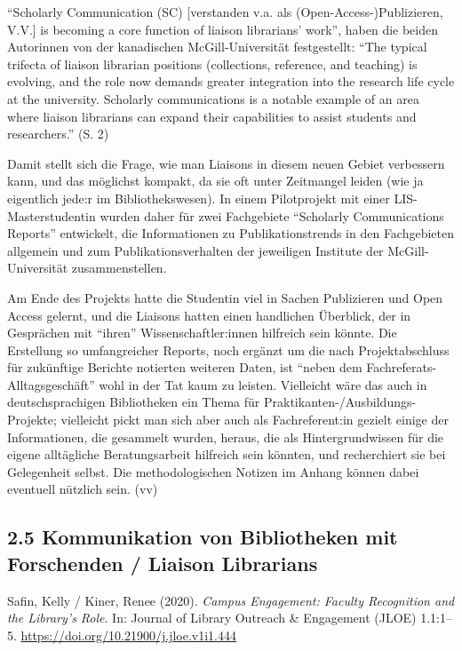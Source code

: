 \documentclass[a4paper,
fontsize=11pt,
oneside,
numbers=noperiodatend,
parskip=half-,
bibliography=totoc,
final
]{scrartcl}
\begin{document}
\enquote{Scholarly Communication (SC) {[}verstanden v.a. als
(Open-Access-)Publizieren, V.V.{]} is becoming a core function of
liaison librarians' work}, haben die beiden Autorinnen von der
kanadischen McGill-Universität festgestellt: \enquote{The typical
trifecta of liaison librarian positions (collections, reference, and
teaching) is evolving, and the role now demands greater integration into
the research life cycle at the university. Scholarly communications is a
notable example of an area where liaison librarians can expand their
capabilities to assist students and researchers.} (S. 2)

Damit stellt sich die Frage, wie man Liaisons in diesem neuen Gebiet
verbessern kann, und das möglichst kompakt, da sie oft unter Zeitmangel
leiden (wie ja eigentlich jede:r im Bibliothekswesen). In einem
Pilotprojekt mit einer LIS-Masterstudentin wurden daher für zwei
Fachgebiete \enquote{Scholarly Communications Reports} entwickelt, die
Informationen zu Publikationstrends in den Fachgebieten allgemein und
zum Publikationsverhalten der jeweiligen Institute der
McGill-Universität zusammenstellen.

Am Ende des Projekts hatte die Studentin viel in Sachen Publizieren und
Open Access gelernt, und die Liaisons hatten einen handlichen Überblick,
der in Gesprächen mit \enquote{ihren} Wissenschaftler:innen hilfreich
sein könnte. Die Erstellung so umfangreicher Reports, noch ergänzt um
die nach Projektabschluss für zukünftige Berichte notierten weiteren
Daten, ist \enquote{neben dem Fachreferats-Alltagsgeschäft} wohl in der
Tat kaum zu leisten. Vielleicht wäre das auch in deutschsprachigen
Bibliotheken ein Thema für Praktikanten-/Ausbildungs-Projekte;
vielleicht pickt man sich aber auch als Fachreferent:in gezielt einige
der Informationen, die gesammelt wurden, heraus, die als
Hintergrundwissen für die eigene alltägliche Beratungsarbeit hilfreich
sein könnten, und recherchiert sie bei Gelegenheit selbst. Die
methodologischen Notizen im Anhang können dabei eventuell nützlich sein.
(vv)

\hypertarget{kommunikation-von-bibliotheken-mit-forschenden-liaison-librarians}{%
\subsection{2.5 Kommunikation von Bibliotheken mit Forschenden / Liaison
Librarians}\label{kommunikation-von-bibliotheken-mit-forschenden-liaison-librarians}}

Safin, Kelly / Kiner, Renee (2020). \emph{Campus Engagement: Faculty
Recognition and the Library's Role}. In: Journal of Library Outreach \&
Engagement (JLOE) 1.1:1--5.
\url{https://doi.org/10.21900/j.jloe.v1i1.444}
\end{document}
